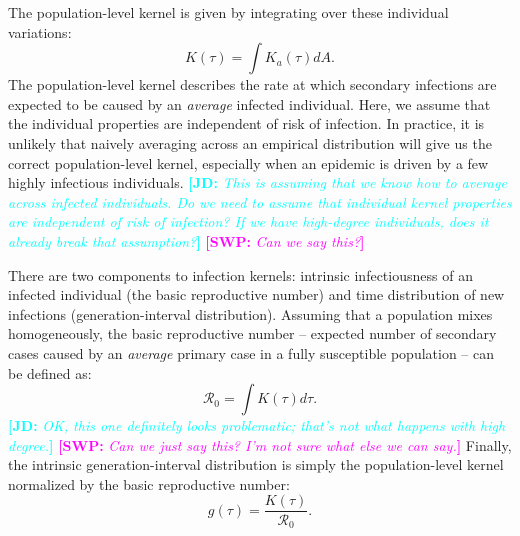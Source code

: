 \documentclass[12pt]{article}
\newcommand{\RR}{\ensuremath{{\mathcal R}}}
\newcommand{\comment}[3]{\textcolor{#1}{\textbf{[#2: }\textsl{#3}\textbf{]}}}
\newcommand{\jd}[1]{\comment{cyan}{JD}{#1}}
\newcommand{\swp}[1]{\comment{magenta}{SWP}{#1}}
\begin{document}
The population-level kernel is given by integrating over these individual variations:
\begin{equation}
K(\tau) = \int K_a (\tau) dA.
\end{equation}
The population-level kernel describes the rate at which secondary infections are expected to be caused by an \emph{average} infected individual.
Here, we assume that the individual properties are independent of risk of infection.
In practice, it is unlikely that naively averaging across an empirical distribution will give us the correct population-level kernel, especially when an epidemic is driven by a few highly infectious individuals.
\jd{This is assuming that we know how to average across infected individuals. Do we need to assume that individual kernel properties are independent of risk of infection? If we have high-degree individuals, does it already break that assumption?}
\swp{Can we say this?}

There are two components to infection kernels: intrinsic infectiousness of an infected individual (the basic reproductive number) and time distribution of new infections (generation-interval distribution).
Assuming that a population mixes homogeneously, the basic reproductive number -- expected number of secondary cases caused by an \emph{average} primary case in a fully susceptible population -- can be defined as: 
\begin{equation}
\RR_0 = \int K(\tau) d\tau.
\end{equation}
\jd{OK, this one definitely looks problematic; that's not what happens with high degree.}
\swp{Can we just say this? I'm not sure what else we can say.}
Finally, the intrinsic generation-interval distribution is simply the population-level kernel normalized by the basic reproductive number:
\begin{equation}
g(\tau) = \frac{K(\tau)}{\RR_0}.
\end{equation}
\end{document}
